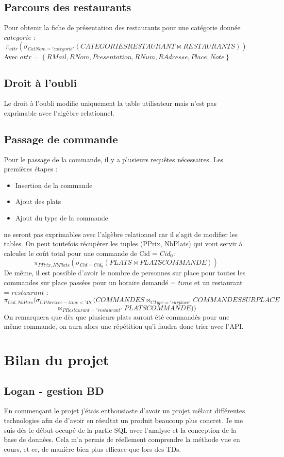 \documentclass[10pt, a4paper]{article}
\begin{document}
\subsection{Parcours des restaurants}
Pour obtenir la fiche de présentation des restaurants pour une catégorie donnée $categorie$ :
$$
\pi_{attr}(\sigma_{CatNom = 'categorie'}(CATEGORIESRESTAURANT \Join RESTAURANTS))
$$
Avec $attr = \left\{ RMail, RNom, Presentation, RNum, RAdresse, Place, Note \right\}$

\subsection{Droit à l'oubli}
Le droit à l'oubli modifie uniquement la table utilisateur mais n'est pas exprimable
avec l'algèbre relationnel.

\subsection{Passage de commande}
Pour le passage de la commande, il y a plusieurs requêtes nécessaires.
Les premières étapes :
\begin{itemize}
    \item Insertion de la commande
    \item Ajout des plats
    \item Ajout du type de la commande
\end{itemize}
ne seront pas exprimables avec l'algèbre relationnel car il s'agit de modifier les tables.
On peut toutefois récupérer les tuples (PPrix, NbPlats) qui vont servir à calculer le coût total pour une commande de Cid = $Cid_0$:
$$
\pi_{PPrix, NbPlats}( \sigma_{Cid = Cid_0}(PLATS \Join PLATSCOMMANDE))
$$
De même, il est possible d'avoir le nombre de personnes sur place pour toutes les commandes sur place passées pour un horaire demandé = $time$ et un restaurant = $restaurant$ :
$$
\pi_{Cid, NbPers}(\sigma_{CPArrivee - time < '4h'}(COMMANDES \Join_{CType = 'sur place'} COMMANDESSURPLACE 
$$
$$
\Join_{PRestaurant = 'restaurant'} PLATSCOMMANDE))
$$
On remarquera que dès que plusieurs plats auront été commandés pour une même commande, on aura alors
une répétition qu'i faudra donc trier avec l'API.

\section{Bilan du projet}
\subsection{Logan - gestion BD}
En commençant le projet j'étais enthousiaste d'avoir un projet mêlant différentes 
technologies afin de d'avoir en résultat un produit beaucoup plus concret. Je me suis dès le 
début occupé de la partie SQL avec l'analyse et la conception de la base de données. Cela m'a 
permis de réellement comprendre la méthode vue en cours, et ce, de manière bien plus efficace 
que lors des TDs.\\
\end{document}
